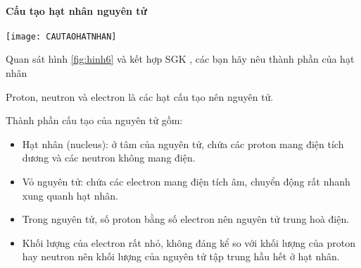 \paragraph{Cấu tạo hạt nhân nguyên tử}
\begin{center}
	\texttt{[image: CAUTAOHATNHAN]}\\
	\label{fig:hinh6}
\end{center}
\begin{hoivadap}
	Quan sát hình \ref{fig:hinh6} và kết hợp SGK , các bạn hãy nêu thành phần của hạt nhân
\end{hoivadap}
\begin{hoplythuyet}
	Proton, neutron và electron là các hạt cấu tạo nên nguyên tử.
\end{hoplythuyet}
\begin{tongket}
	Thành phần cấu tạo của nguyên tử gồm:
	\begin{itemize}
		\item  Hạt nhân (nucleus): ở tâm của nguyên tử, chứa các proton mang điện tích dương và các neutron không mang điện.
		\item Vỏ nguyên tử: chứa các electron mang điện tích âm, chuyển động rất nhanh xung quanh hạt nhân.
		\item Trong nguyên tử, số proton bằng số electron nên nguyên tử trung hoà điện.
		\item Khối lượng của electron rất nhỏ, không đáng kể so với khối lượng của proton hay neutron nên khối lượng của nguyên tử tập trung hầu hết ở hạt nhân.
	\end{itemize}
\end{tongket}


